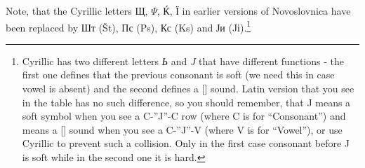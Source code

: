 Note, that the Cyrillic letters Щ, $\Psi$, Ќ, Ї in earlier versions of Novoslovnica have been replaced by Шт (Št), Пс (Ps), Кс (Ks) and Ји (Jі).\footnote{Cyrillic has two different letters \textit{Ь} and \textit{J} that have different functions - the first one defines that the previous consonant is soft (we need this in case vowel is absent) and the second defines a [\textctj] sound. Latin version that you see in the table has no such difference, so you should remember, that J means a soft symbol when you see a C-”J”-C row (where C is for “Consonant”) and means a [\textctj] sound when you see a C-”J”-V (where V is for “Vowel”), or use Cyrillic to prevent such a collision. Only in the first case consonant before J is soft while in the second one it is hard.}
